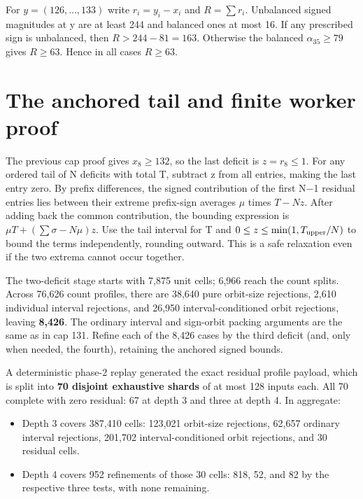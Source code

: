 \documentclass[11pt,letterpaper]{article}
\begin{document}
For \(y=(126,\dots,133)\) write \(r_i=y_i-x_i\) and \(R=\sum r_i\).
Unbalanced signed magnitudes at y are at least 244 and balanced ones at
most 16. If any prescribed sign is unbalanced, then \(R>244-81=163\).
Otherwise the balanced \(\alpha_{35}\ge79\) gives \(R\ge63\). Hence in
all cases \(R\ge63\).

\section{The anchored tail and finite worker
proof}\label{the-anchored-tail-and-finite-worker-proof}

The previous cap proof gives \(x_8\ge132\), so the last deficit is
\(z=r_8\le1\). For any ordered tail of N deficits with total T, subtract
z from all entries, making the last entry zero. By prefix differences,
the signed contribution of the first N−1 residual entries lies between
their extreme prefix-sign averages \(\mu\) times \(T-Nz\). After adding
back the common contribution, the bounding expression is
\(\mu T+(\sum\sigma-N\mu)z\). Use the tail interval for T and
\(0\le z\le\min(1,T_{\rm upper}/N)\) to bound the terms independently,
rounding outward. This is a safe relaxation even if the two extrema
cannot occur together.

The two-deficit stage starts with 7,875 unit cells; 6,966 reach the
count splits. Across 76,626 count profiles, there are 38,640 pure
orbit-size rejections, 2,610 individual interval rejections, and 26,950
interval-conditioned orbit rejections, leaving \textbf{8,426}. The
ordinary interval and sign-orbit packing arguments are the same as in
cap 131. Refine each of the 8,426 cases by the third deficit (and, only
when needed, the fourth), retaining the anchored signed bounds.

A deterministic phase-2 replay generated the exact residual profile
payload, which is split into \textbf{70 disjoint exhaustive shards} of
at most 128 inputs each. All 70 complete with zero residual: 67 at depth
3 and three at depth 4. In aggregate:
\begin{itemize}
\item Depth 3 covers 387,410 cells:
123,021 orbit-size rejections, 62,657 ordinary interval rejections,
201,702 interval-conditioned orbit rejections, and 30 residual cells.
\item Depth 4 covers 952 refinements of those 30 cells: 818, 52, and 82 by the
respective three tests, with none remaining.

\end{itemize}
\end{document}
